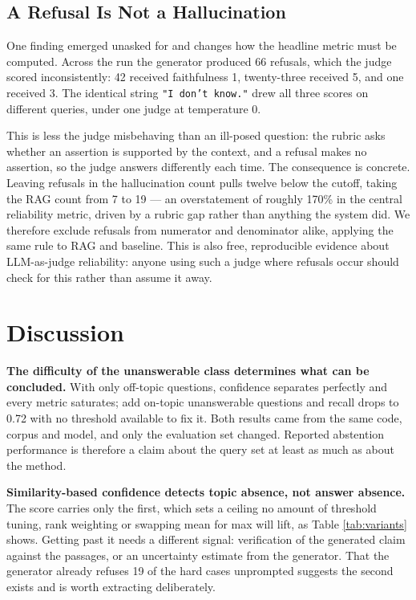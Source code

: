 \documentclass[conference]{IEEEtran}
\begin{document}
\subsection{A Refusal Is Not a Hallucination}
\label{sec:refusals}

One finding emerged unasked for and changes how the headline metric must be computed. Across the run the generator produced 66 refusals, which the judge scored inconsistently: 42 received faithfulness 1, twenty-three received 5, and one received 3. The identical string \texttt{"I don't know."} drew all three scores on different queries, under one judge at temperature 0.

This is less the judge misbehaving than an ill-posed question: the rubric asks whether an assertion is supported by the context, and a refusal makes no assertion, so the judge answers differently each time. The consequence is concrete. Leaving refusals in the hallucination count pulls twelve below the cutoff, taking the RAG count from 7 to 19 --- an overstatement of roughly 170\% in the central reliability metric, driven by a rubric gap rather than anything the system did. We therefore exclude refusals from numerator and denominator alike, applying the same rule to RAG and baseline. This is also free, reproducible evidence about LLM-as-judge reliability: anyone using such a judge where refusals occur should check for this rather than assume it away.

\section{Discussion}
\label{sec:discussion}

\textbf{The difficulty of the unanswerable class determines what can be concluded.} With only off-topic questions, confidence separates perfectly and every metric saturates; add on-topic unanswerable questions and recall drops to 0.72 with no threshold available to fix it. Both results came from the same code, corpus and model, and only the evaluation set changed. Reported abstention performance is therefore a claim about the query set at least as much as about the method.

\textbf{Similarity-based confidence detects topic absence, not answer absence.} The score carries only the first, which sets a ceiling no amount of threshold tuning, rank weighting or swapping mean for max will lift, as Table \ref{tab:variants} shows. Getting past it needs a different signal: verification of the generated claim against the passages, or an uncertainty estimate from the generator. That the generator already refuses 19 of the hard cases unprompted suggests the second exists and is worth extracting deliberately.
\end{document}
